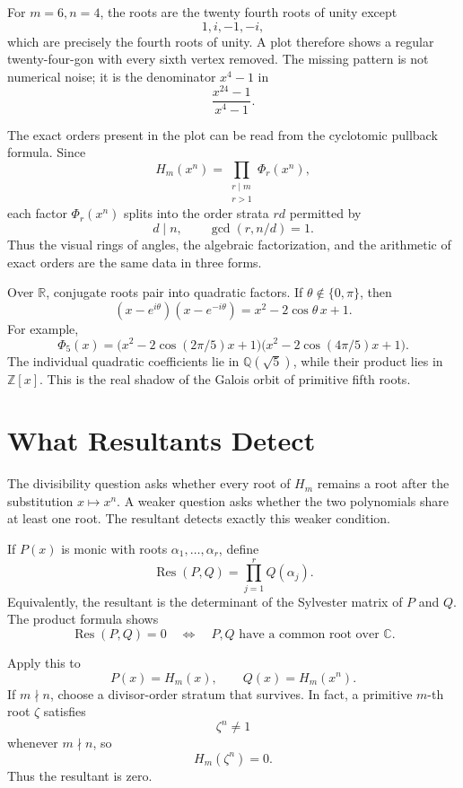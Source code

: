 For \(m=6,n=4\), the roots are the twenty fourth roots of unity except
\[
  1,i,-1,-i,
\]
which are precisely the fourth roots of unity.  A plot therefore shows a regular twenty-four-gon with every sixth vertex removed.  The missing pattern is not numerical noise; it is the denominator \(x^4-1\) in
\[
  \frac{x^{24}-1}{x^4-1}.
\]

The exact orders present in the plot can be read from the cyclotomic pullback formula.  Since
\[
  H_m(x^n)
  =\prod_{\substack{r\mid m\\r>1}}\Phi_r(x^n),
\]
each factor \(\Phi_r(x^n)\) splits into the order strata \(rd\) permitted by
\[
  d\mid n,
  \qquad
  \gcd(r,n/d)=1.
\]
Thus the visual rings of angles, the algebraic factorization, and the arithmetic of exact orders are the same data in three forms.

Over \(\mathbb R\), conjugate roots pair into quadratic factors.  If \(\theta\notin\{0,\pi\}\), then
\[
  (x-e^{i\theta})(x-e^{-i\theta})
  =x^2-2\cos\theta\,x+1.
\]
For example,
\[
  \Phi_5(x)
  =\bigl(x^2-2\cos(2\pi/5)x+1\bigr)
   \bigl(x^2-2\cos(4\pi/5)x+1\bigr).
\]
The individual quadratic coefficients lie in \(\mathbb Q(\sqrt5)\), while their product lies in \(\mathbb Z[x]\).  This is the real shadow of the Galois orbit of primitive fifth roots.

\section{What Resultants Detect}

The divisibility question asks whether every root of \(H_m\) remains a root after the substitution \(x\mapsto x^n\).  A weaker question asks whether the two polynomials share at least one root.  The resultant detects exactly this weaker condition.

If \(P(x)\) is monic with roots \(\alpha_1,\ldots,\alpha_r\), define
\[
  \operatorname{Res}(P,Q)
  =\prod_{j=1}^{r}Q(\alpha_j).
\]
Equivalently, the resultant is the determinant of the Sylvester matrix of \(P\) and \(Q\).  The product formula shows
\[
  \operatorname{Res}(P,Q)=0
  \quad\Longleftrightarrow\quad
  P,Q\text{ have a common root over }\mathbb C.
\]

Apply this to
\[
  P(x)=H_m(x),
  \qquad
  Q(x)=H_m(x^n).
\]
If \(m\nmid n\), choose a divisor-order stratum that survives.  In fact, a primitive \(m\)-th root \(\zeta\) satisfies
\[
  \zeta^n\neq1
\]
whenever \(m\nmid n\), so
\[
  H_m(\zeta^n)=0.
\]
Thus the resultant is zero.

